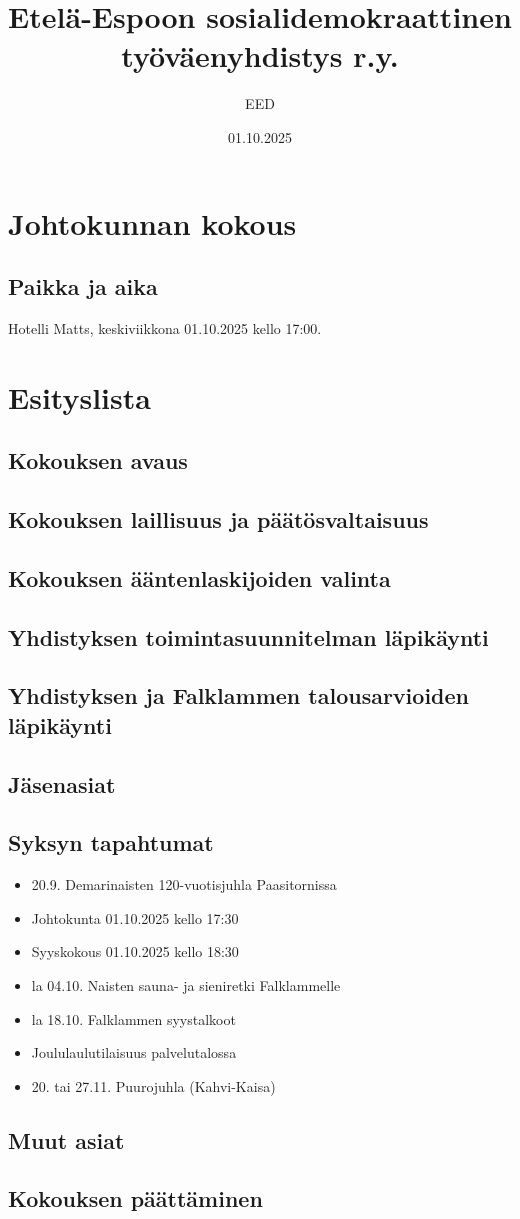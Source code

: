 \documentclass[a4paper,12pt]{article}
\title{Etelä-Espoon sosialidemokraattinen työväenyhdistys r.y.}
\author{EED}
\date{01.10.2025}
\begin{document}
\maketitle
\tableofcontents
\section*{Johtokunnan kokous}
\subsection*{Paikka ja aika}
Hotelli Matts, keskiviikkona 01.10.2025 kello 17:00.
\section*{Esityslista}
\subsection{Kokouksen avaus}
\subsection{Kokouksen laillisuus ja päätösvaltaisuus}
\subsection{Kokouksen ääntenlaskijoiden valinta}
\subsection{Yhdistyksen toimintasuunnitelman läpikäynti}
\subsection{Yhdistyksen ja Falklammen talousarvioiden läpikäynti}
\subsection{Jäsenasiat}
\subsection{Syksyn tapahtumat}
\begin{itemize}
\item{20.9. Demarinaisten 120-vuotisjuhla Paasitornissa}
\item{Johtokunta 01.10.2025 kello 17:30}
\item{Syyskokous 01.10.2025 kello 18:30}
\item{la 04.10. Naisten sauna- ja sieniretki Falklammelle}
\item{la 18.10. Falklammen syystalkoot}
\item{Joululaulutilaisuus palvelutalossa}
\item{20. tai 27.11. Puurojuhla (Kahvi-Kaisa)}
\end{itemize}
\subsection{Muut asiat}
\subsection{Kokouksen päättäminen}
\end{document}
